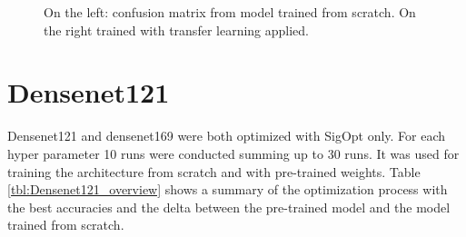 \begin{figure}[h]
\centering
\caption{On the left: confusion matrix from model trained from scratch. On the right trained with transfer learning applied.}
\label{fig:resnet18-cm}
\end{figure}














\section{Densenet121}

Densenet121 and densenet169 were both optimized with SigOpt only. For each hyper parameter 10 runs were conducted summing up to 30 runs. It was used for training the architecture from scratch and with pre-trained weights. Table \ref{tbl:Densenet121_overview} shows a summary of the optimization process with the best accuracies and the delta between the pre-trained model and the model trained from scratch.

